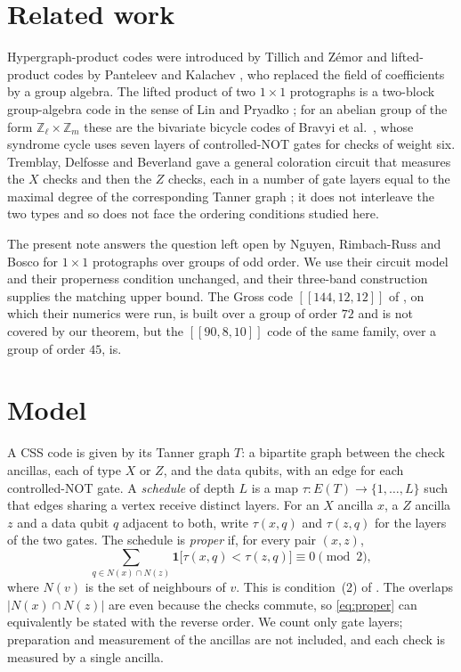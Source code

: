 \documentclass[11pt,a4paper]{article}
\theoremstyle{definition}
\theoremstyle{plain}
\newcommand{\one}{\mathbf{1}}
\begin{document}
\section{Related work}\label{sec:related}
Hypergraph-product codes were introduced by Tillich and Z\'emor
\cite{TillichZemor2014} and lifted-product codes by Panteleev and Kalachev
\cite{PanteleevKalachev2021}, who replaced the field of coefficients by a
group algebra. The lifted product of two $1\times1$ protographs is a
two-block group-algebra code in the sense of Lin and Pryadko
\cite{LinPryadko2023}; for an abelian group of the form
$\mathbb{Z}_\ell\times\mathbb{Z}_m$ these are the bivariate bicycle codes of
Bravyi et al.\ \cite{Bravyi2024}, whose syndrome cycle uses seven layers of
controlled-NOT gates for checks of weight six. Tremblay, Delfosse and
Beverland gave a general coloration circuit that measures the $X$ checks and
then the $Z$ checks, each in a number of gate layers equal to the maximal
degree of the corresponding Tanner graph \cite{TDB2022}; it does not
interleave the two types and so does not face the ordering conditions
studied here.

The present note answers the question left open by Nguyen, Rimbach-Russ and
Bosco \cite{NRB2026} for $1\times1$ protographs over groups of odd order. We
use their circuit model and their properness condition unchanged, and their
three-band construction supplies the matching upper bound. The Gross code
$[[144,12,12]]$ of \cite{Bravyi2024}, on which their numerics were run, is
built over a group of order $72$ and is not covered by our theorem, but the
$[[90,8,10]]$ code of the same family, over a group of order $45$, is.

\section{Model}\label{sec:model}
A CSS code is given by its Tanner graph $T$: a bipartite graph between the
check ancillas, each of type $X$ or $Z$, and the data qubits, with an edge for
each controlled-NOT gate. A \emph{schedule} of depth $L$ is a map
$\tau:E(T)\to\{1,\dots,L\}$ such that edges sharing a vertex receive distinct
layers. For an $X$ ancilla $x$, a $Z$ ancilla $z$ and a data qubit $q$ adjacent
to both, write $\tau(x,q)$ and $\tau(z,q)$ for the layers of the two gates. The
schedule is \emph{proper} if, for every pair $(x,z)$,
\begin{equation}\label{eq:proper}
\sum_{q\in N(x)\cap N(z)}\one\bigl[\tau(x,q)<\tau(z,q)\bigr]\equiv0\pmod 2,
\end{equation}
where $N(v)$ is the set of neighbours of $v$. This is condition~(2) of
\cite{NRB2026}. The overlaps $\lvert N(x)\cap N(z)\rvert$ are even because the
checks commute, so \eqref{eq:proper} can equivalently be stated with the
reverse order. We count only gate layers; preparation and measurement of the
ancillas are not included, and each check is measured by a single ancilla.
\end{document}
